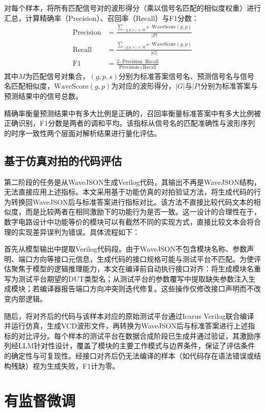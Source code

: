 对每个样本，将所有匹配信号对的波形得分（乘以信号名匹配的相似度权重）进行汇总，计算精确率（Precision）、召回率（Recall）与F1分数：
\begin{align}
  \text{Precision} &= \frac{\sum_{(g,p,s) \in M} s \cdot \text{WaveScore}(g, p)}{|P|} \\
  \text{Recall}    &= \frac{\sum_{(g,p,s) \in M} s \cdot \text{WaveScore}(g, p)}{|G|} \\
  \text{F1}        &= \frac{2 \cdot \text{Precision} \cdot \text{Recall}}{\text{Precision} + \text{Recall}}
\end{align}
其中$M$为匹配信号对集合，$(g, p, s)$分别为标准答案信号名、预测信号名与信号名匹配相似度，$\text{WaveScore}(g, p)$为对应的波形得分，$|G|$与$|P|$分别为标准答案与预测结果中的信号总数。

精确率衡量预测结果中有多大比例是正确的，召回率衡量标准答案中有多大比例被正确识别，F1分数是两者的调和平均。该指标从信号名的匹配准确性与波形序列的时序一致性两个层面对解析结果进行量化评估。

\subsection{基于仿真对拍的代码评估}\label{sec:sim-eval}

第二阶段的任务是从WaveJSON生成Verilog代码，其输出不再是WaveJSON结构，无法直接应用上述指标。本文采用基于功能仿真的对拍验证方法，将生成代码的行为转换回WaveJSON后与标准答案进行指标对比。该方法不直接比较代码文本的相似度，而是比较两者在相同激励下的功能行为是否一致。这一设计的合理性在于，数字电路设计中功能等价的模块可以有截然不同的实现方式，直接比较文本会将合理的实现差异误判为错误。具体流程如下：

首先从模型输出中提取Verilog代码段。由于WaveJSON不包含模块名称、参数声明、端口方向等接口元信息，生成代码的接口规格可能与测试平台不匹配。为使评估聚焦于模型的逻辑推理能力，本文在编译前自动执行接口对齐：将生成模块名重写为测试平台期望的DUT类型名；从测试平台的参数覆写中提取缺失参数注入生成模块；若编译器报告端口方向冲突则迭代修复。这些操作仅修改接口声明而不改变内部逻辑。

随后，将对齐后的代码与该样本对应的原始测试平台通过Icarus Verilog联合编译并运行仿真，生成VCD波形文件，再转换为WaveJSON后与标准答案进行上述指标的对比评分。每个样本的测试平台在数据合成阶段已生成并通过验证，其激励序列经LLM针对性设计，覆盖了模块的主要工作模式与边界条件，保证了评估条件的确定性与可复现性。经接口对齐后仍无法编译的样本（如代码存在语法错误或结构残缺）视为生成失败，F1计为零。


\section{有监督微调}

